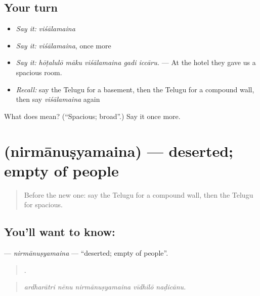 \subsection*{Your turn}
\begin{itemize}
\raggedright
  \item \emph{Say it:} \emph{viśālamaina}
  \item \emph{Say it:} \emph{viśālamaina}, once more
  \item \emph{Say it:} \emph{hōṭalulō māku viśālamaina gadi iccāru.} — At the hotel they gave us a spacious room.
  \item \emph{Recall:} say the Telugu for a basement, then the Telugu for a compound wall, then say \emph{viśālamaina} again
\end{itemize}

\begin{tcolorbox}[breakable,colback=teal!4,colframe=teal!35!black,title={Before you move on}]
What does  mean? (\textquotedblleft{}Spacious; broad\textquotedblright{}.) Say it once more.
\end{tcolorbox}
\section[\texorpdfstring{\te{నిర్మానుష్యమైన} (nirmānuṣyamaina)}{నిర్మానుష్యమైన (nirmānuṣyamaina)}]{ (nirmānuṣyamaina) — deserted; empty of people}

\label{lesson:TE-C467-nirmanusyamaina}



\begin{quote}
Before the new one: say the Telugu for a compound wall, then the Telugu for spacious.
\end{quote}

\subsection*{You'll want to know: }
\textbf{} — \emph{nirmānuṣyamaina} — \textquotedblleft{}deserted; empty of people\textquotedblright{}.

\begin{quote}
    .
\end{quote}

\begin{quote}
\emph{ardharātri nēnu nirmānuṣyamaina vīdhilō naḍicānu.}
\end{quote}

